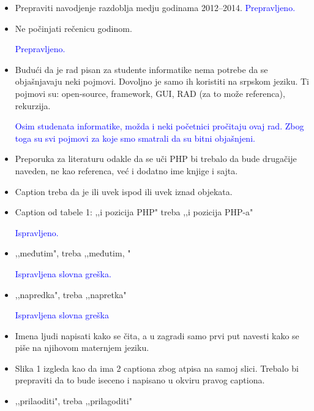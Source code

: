 \documentclass[a4paper]{report}
\newcommand{\odgovor}[1]{\textcolor{blue}{#1}}
\begin{document}
\begin{itemize}
\item Prepraviti navodjenje razdoblja medju godinama 2012--2014.
\odgovor{Prepravljeno.}

\item Ne počinjati rečenicu godinom.

\odgovor{Prepravljeno.}

\item Budući da je rad pisan za studente informatike nema potrebe da se objašnjavaju neki pojmovi. Dovoljno je samo ih koristiti na srpskom jeziku. Ti pojmovi su: open-source, framework, GUI, RAD (za to može referenca), rekurzija.

\odgovor{Osim studenata informatike, možda i neki početnici pročitaju ovaj rad. Zbog toga su svi pojmovi za koje smo smatrali da su bitni objašnjeni.}

\item Preporuka za literaturu odakle da se uči PHP bi trebalo da bude drugačije naveden, ne kao referenca, već i dodatno ime knjige i sajta.

\odgovor{}

\item Caption treba da je ili uvek ispod ili uvek iznad objekata.

\odgovor{}

\item Caption od tabele 1: ,,i pozicija PHP" treba ,,i pozicija PHP-a"

\odgovor{Ispravljeno.}

\item ,,međutim", treba ,,međutim, "

\odgovor{Ispravljena slovna greška.}
 
\item ,,napredka", treba ,,napretka"

\odgovor{Ispravljena slovna greška}

\item Imena ljudi napisati kako se čita, a u zagradi samo prvi put navesti kako se piše na njihovom maternjem jeziku.

\odgovor{}

\item Slika 1 izgleda kao da ima 2 captiona zbog atpisa na samoj slici. Trebalo bi prepraviti da to bude iseceno i napisano u okviru pravog captiona.

\odgovor{}

\item ,,prilaoditi", treba ,,prilagoditi" 


\end{itemize}
\end{document}

